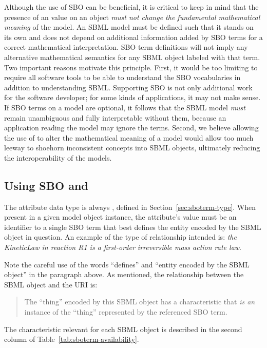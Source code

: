 Although the use of SBO can be beneficial, it is critical to keep
in mind that the presence of an  value on an object
\emph{must not change the fundamental mathematical meaning} of the
model.  An SBML model must be defined such that it stands on its
own and does not depend on additional information added by SBO
terms for a correct mathematical interpretation.  SBO term
definitions will not imply any alternative mathematical semantics
for any SBML object labeled with that term.  Two important
reasons motivate this principle.  First, it would be too limiting
to require all software tools to be able to understand the SBO
vocabularies in addition to understanding SBML.
Supporting SBO is not only additional work for the software
developer; for some kinds of applications, it may not make sense.
If SBO terms on a model are optional, it follows that the SBML
model \emph{must} remain unambiguous and fully interpretable
without them, because an application reading the model may ignore
the terms.  Second, we believe allowing the use of 
to alter the mathematical meaning of a model would allow
  too much leeway to shoehorn inconsistent concepts into SBML
objects, ultimately reducing the interoperability of the
models.

\subsection{Using SBO and }

The  attribute data type is always
, defined in Section~\ref{sec:sboterm-type}.
When present in a given model object instance, the
attribute's value must be an identifier 
to a single SBO term that best defines the entity encoded by
the SBML object in question.  An example of the type of
relationship intended is: \emph{the KineticLaw in reaction R1 is a
  first-order irreversible mass action rate law}.

Note the careful use of the words ``defines'' and ``entity encoded
by the SBML object'' in the paragraph above.  As mentioned, the
relationship between the SBML object and the URI is:

\begin{quote}
  The ``thing'' encoded by this SBML object has a characteristic that \emph{is an} instance
  of the ``thing'' represented by the referenced SBO term.
\end{quote}

The characteristic relevant for each SBML object is described in the second column of Table~\ref{tab:sboterm-availability}.


